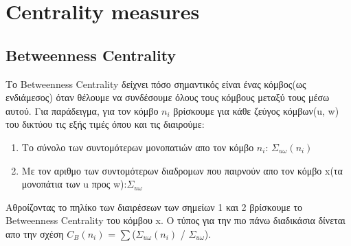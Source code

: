 \documentclass[12pt]{article}
\begin{document}
	
	
	\newpage
	\section{Centrality measures}
	
	\subsection{Betweenness Centrality}
	Το Betweenness Centrality δείχνει πόσο σημαντικός είναι ένας κόμβος(ως ενδιάμεσος) όταν θέλουμε να συνδέσουμε όλους τους κόμβους μεταξύ τους μέσω αυτού. Για παράδειγμα, για τον κόμβο \(n_i\) βρίσκουμε για κάθε ζεύγος κόμβων(u, w) του δικτύου τις εξής τιμές όπου και τις διαιρούμε:
	\begin{enumerate}
		\item Το σύνολο των συντομότερων μονοπατιών απο τον κόμβο \(n_i\): \( \Sigma_{u \omega}(n_i) \)
		\item Με τον αριθμο των συντομότερων διαδρομων που παιρνούν απο τον κόμβο x(τα μονοπάτια των u προς w):\( \Sigma_{u \omega} \)
	\end{enumerate}
	Αθροίζοντας το πηλίκο των διαιρέσεων των σημείων 1 και 2 βρίσκουμε το Betweenness Centrality του κόμβου x.
	Ο τύπος για την πιο πάνω διαδικάσια δίνεται απο την σχέση \(C_B(n_i)\) = $\sum$(\( \Sigma_{u \omega}(n_i) \) / \( \Sigma_{u \omega} \)).
	
\end{document}
